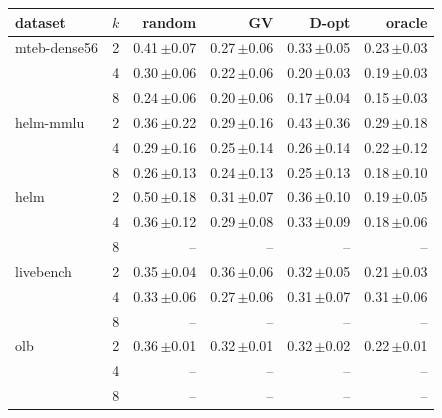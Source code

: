 \begin{tabular}{lrrrrr}
\toprule
dataset & $k$ & random & GV & D-opt & oracle \\
\midrule
mteb-dense56 & 2 & 0.41\,{\scriptsize$\pm$0.07} & 0.27\,{\scriptsize$\pm$0.06} & 0.33\,{\scriptsize$\pm$0.05} & 0.23\,{\scriptsize$\pm$0.03} \\
 & 4 & 0.30\,{\scriptsize$\pm$0.06} & 0.22\,{\scriptsize$\pm$0.06} & 0.20\,{\scriptsize$\pm$0.03} & 0.19\,{\scriptsize$\pm$0.03} \\
 & 8 & 0.24\,{\scriptsize$\pm$0.06} & 0.20\,{\scriptsize$\pm$0.06} & 0.17\,{\scriptsize$\pm$0.04} & 0.15\,{\scriptsize$\pm$0.03} \\
\midrule
helm-mmlu & 2 & 0.36\,{\scriptsize$\pm$0.22} & 0.29\,{\scriptsize$\pm$0.16} & 0.43\,{\scriptsize$\pm$0.36} & 0.29\,{\scriptsize$\pm$0.18} \\
 & 4 & 0.29\,{\scriptsize$\pm$0.16} & 0.25\,{\scriptsize$\pm$0.14} & 0.26\,{\scriptsize$\pm$0.14} & 0.22\,{\scriptsize$\pm$0.12} \\
 & 8 & 0.26\,{\scriptsize$\pm$0.13} & 0.24\,{\scriptsize$\pm$0.13} & 0.25\,{\scriptsize$\pm$0.13} & 0.18\,{\scriptsize$\pm$0.10} \\
\midrule
helm & 2 & 0.50\,{\scriptsize$\pm$0.18} & 0.31\,{\scriptsize$\pm$0.07} & 0.36\,{\scriptsize$\pm$0.10} & 0.19\,{\scriptsize$\pm$0.05} \\
 & 4 & 0.36\,{\scriptsize$\pm$0.12} & 0.29\,{\scriptsize$\pm$0.08} & 0.33\,{\scriptsize$\pm$0.09} & 0.18\,{\scriptsize$\pm$0.06} \\
 & 8 & -- & -- & -- & -- \\
\midrule
livebench & 2 & 0.35\,{\scriptsize$\pm$0.04} & 0.36\,{\scriptsize$\pm$0.06} & 0.32\,{\scriptsize$\pm$0.05} & 0.21\,{\scriptsize$\pm$0.03} \\
 & 4 & 0.33\,{\scriptsize$\pm$0.06} & 0.27\,{\scriptsize$\pm$0.06} & 0.31\,{\scriptsize$\pm$0.07} & 0.31\,{\scriptsize$\pm$0.06} \\
 & 8 & -- & -- & -- & -- \\
\midrule
olb & 2 & 0.36\,{\scriptsize$\pm$0.01} & 0.32\,{\scriptsize$\pm$0.01} & 0.32\,{\scriptsize$\pm$0.02} & 0.22\,{\scriptsize$\pm$0.01} \\
 & 4 & -- & -- & -- & -- \\
 & 8 & -- & -- & -- & -- \\
\bottomrule
\end{tabular}
